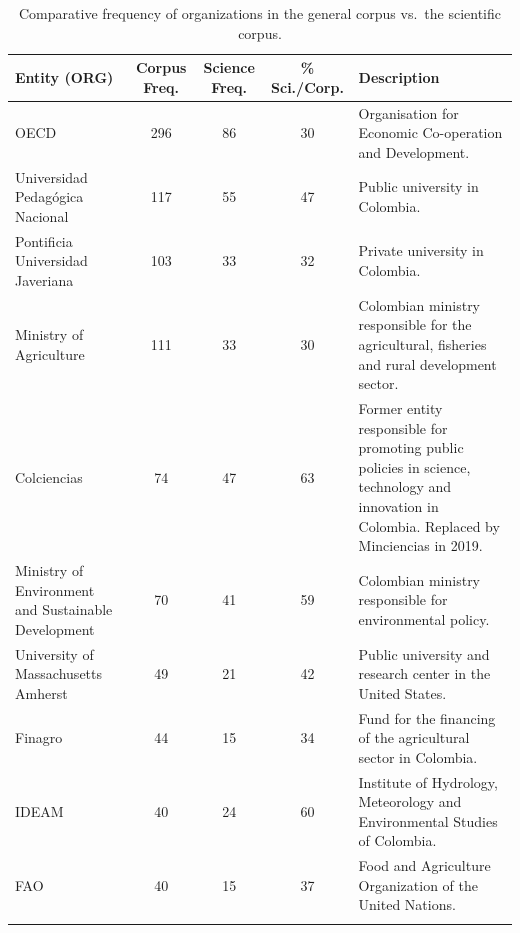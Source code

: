 \documentclass[pdflatex,sn-mathphys-num, iicol]{sn-jnl}
\begin{document}
	\begin{table}[h!]
		\caption{Comparative frequency of organizations in the general corpus vs.\ the scientific corpus.}
		\label{tab:ents_org}
		{\footnotesize
			\begin{tabular}{@{}p{3.5cm}cccP{5cm}@{}}
				\toprule
				\textbf{Entity (ORG)} & \textbf{Corpus Freq.} & \textbf{Science Freq.} & \textbf{\% Sci./Corp.} & \textbf{Description} \\
				\midrule
				OECD                             & 296 & 86 & 30 & Organisation for Economic Co-operation and Development. \\
				Universidad Pedag{\'o}gica Nacional & 117 & 55 & 47 & Public university in Colombia. \\
				Pontificia Universidad Javeriana & 103 & 33 & 32 & Private university in Colombia. \\
				Ministry of Agriculture          & 111 & 33 & 30 & Colombian ministry responsible for the agricultural, fisheries and rural development sector. \\
				Colciencias                      & 74  & 47 & 63 & Former entity responsible for promoting public policies in science, technology and innovation in Colombia. Replaced by Minciencias in 2019. \\
				Ministry of Environment and Sustainable Development & 70 & 41 & 59 & Colombian ministry responsible for environmental policy. \\
				University of Massachusetts Amherst & 49 & 21 & 42 & Public university and research center in the United States. \\
				Finagro                          & 44  & 15 & 34 & Fund for the financing of the agricultural sector in Colombia. \\
				IDEAM                            & 40  & 24 & 60 & Institute of Hydrology, Meteorology and Environmental Studies of Colombia. \\
				FAO                              & 40  & 15 & 37 & Food and Agriculture Organization of the United Nations. \\
				\botrule
			\end{tabular}
		}
	\end{table}
	
\end{document}
